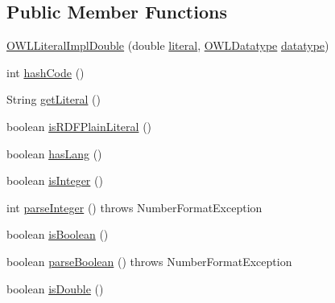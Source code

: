 \subsection*{Public Member Functions}
\begin{DoxyCompactItemize}
\item 
\hyperlink{classuk_1_1ac_1_1manchester_1_1cs_1_1owl_1_1owlapi_1_1_o_w_l_literal_impl_double_a8257115ab336514a0306a2d63c31f16f}{O\-W\-L\-Literal\-Impl\-Double} (double \hyperlink{classuk_1_1ac_1_1manchester_1_1cs_1_1owl_1_1owlapi_1_1_o_w_l_literal_impl_double_a1e5abba77c29f863ad39e98d24284fd6}{literal}, \hyperlink{interfaceorg_1_1semanticweb_1_1owlapi_1_1model_1_1_o_w_l_datatype}{O\-W\-L\-Datatype} \hyperlink{classuk_1_1ac_1_1manchester_1_1cs_1_1owl_1_1owlapi_1_1_o_w_l_literal_impl_double_a4ce7fb31d6c0c2530b4220c714a6d17f}{datatype})
\item 
int \hyperlink{classuk_1_1ac_1_1manchester_1_1cs_1_1owl_1_1owlapi_1_1_o_w_l_literal_impl_double_a884de377a04fbd146483225593463504}{hash\-Code} ()
\item 
String \hyperlink{classuk_1_1ac_1_1manchester_1_1cs_1_1owl_1_1owlapi_1_1_o_w_l_literal_impl_double_a4d3e51f491e60b0602919422ee8dcacc}{get\-Literal} ()
\item 
boolean \hyperlink{classuk_1_1ac_1_1manchester_1_1cs_1_1owl_1_1owlapi_1_1_o_w_l_literal_impl_double_a819245d84c740e1b59636ff9c7c8a989}{is\-R\-D\-F\-Plain\-Literal} ()
\item 
boolean \hyperlink{classuk_1_1ac_1_1manchester_1_1cs_1_1owl_1_1owlapi_1_1_o_w_l_literal_impl_double_a9a2130d90d247324b17159ed0b2a3239}{has\-Lang} ()
\item 
boolean \hyperlink{classuk_1_1ac_1_1manchester_1_1cs_1_1owl_1_1owlapi_1_1_o_w_l_literal_impl_double_a5025bc6dfa7dbed6872ee9e073a398a8}{is\-Integer} ()
\item 
int \hyperlink{classuk_1_1ac_1_1manchester_1_1cs_1_1owl_1_1owlapi_1_1_o_w_l_literal_impl_double_ae686de9bb9c4e782eb3236b72aa59648}{parse\-Integer} ()  throws Number\-Format\-Exception 
\item 
boolean \hyperlink{classuk_1_1ac_1_1manchester_1_1cs_1_1owl_1_1owlapi_1_1_o_w_l_literal_impl_double_a46fd5c7c9fa593dec76d5f0ad6a1e904}{is\-Boolean} ()
\item 
boolean \hyperlink{classuk_1_1ac_1_1manchester_1_1cs_1_1owl_1_1owlapi_1_1_o_w_l_literal_impl_double_a08c45c8de60a7ac35a78d44f44c11f7c}{parse\-Boolean} ()  throws Number\-Format\-Exception 
\item 
boolean \hyperlink{classuk_1_1ac_1_1manchester_1_1cs_1_1owl_1_1owlapi_1_1_o_w_l_literal_impl_double_af5121cb43f710d9a65c4ca20a85fb9ed}{is\-Double} ()

\end{DoxyCompactItemize}
